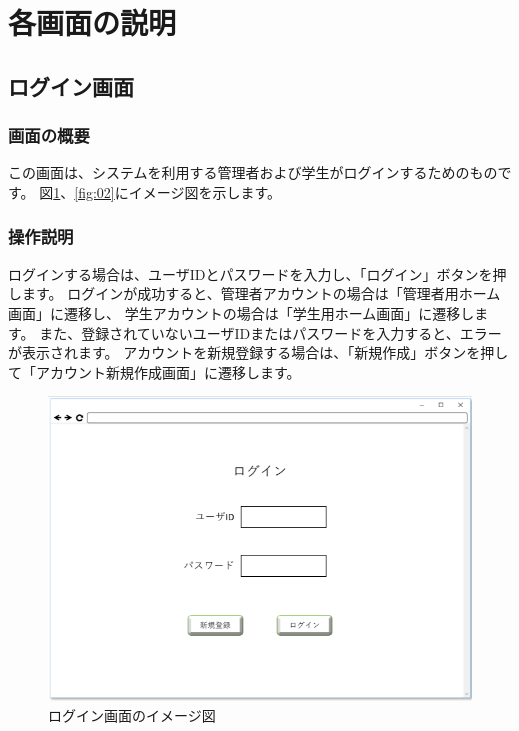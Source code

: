 \section{各画面の説明}
\subsection{ログイン画面}
\subsubsection{画面の概要}
この画面は、システムを利用する管理者および学生がログインするためのものです。
図\ref{fig:01}、\ref{fig:02}にイメージ図を示します。

\subsubsection{操作説明}
ログインする場合は、ユーザIDとパスワードを入力し、「ログイン」ボタンを押します。
ログインが成功すると、管理者アカウントの場合は「管理者用ホーム画面」に遷移し、
学生アカウントの場合は「学生用ホーム画面」に遷移します。
また、登録されていないユーザIDまたはパスワードを入力すると、エラーが表示されます。
アカウントを新規登録する場合は、「新規作成」ボタンを押して「アカウント新規作成画面」に遷移します。

\newpage
\begin{figure}[phtbp]
  \begin{center}
    \includegraphics[width=1\linewidth,clip]{./img/01.png}
    \caption{ログイン画面のイメージ図}\label{fig:01}
  \end{center}
\end{figure}

